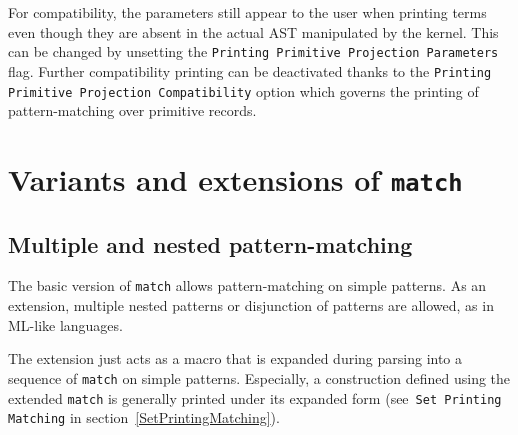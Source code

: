 
For compatibility, the parameters still appear to the user when printing terms
even though they are absent in the actual AST manipulated by the kernel. This
can be changed by unsetting the {\tt Printing Primitive Projection Parameters}
flag. Further compatibility printing can be deactivated thanks to the
{\tt Printing Primitive Projection Compatibility} option which governs the
printing of pattern-matching over primitive records.

\section{Variants and extensions of {\mbox{\tt match}}
\label{Extensions-of-match}
}

\subsection{Multiple and nested pattern-matching
\label{Mult-match}}

The basic version of \verb+match+ allows pattern-matching on simple
patterns. As an extension, multiple nested patterns or disjunction of
patterns are allowed, as in ML-like languages.

The extension just acts as a macro that is expanded during parsing
into a sequence of {\tt match} on simple patterns. Especially, a
construction defined using the extended {\tt match} is generally
printed under its expanded form (see~\texttt{Set Printing Matching} in
section~\ref{SetPrintingMatching}).

